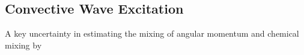 {\color{purple}
\subsection{Convective Wave Excitation}
}

A key uncertainty in estimating the mixing of angular momentum and chemical mixing by 
